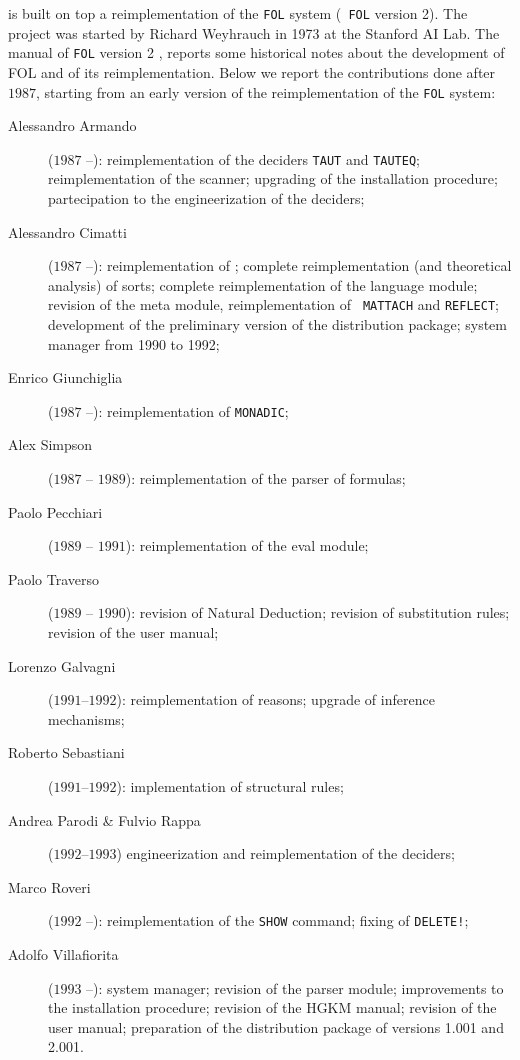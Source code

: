 {\GF} is built on top a reimplementation of the {\tt FOL} system ({\tt
FOL} version 2).
The project was started by Richard Weyhrauch in 1973 at the Stanford
AI Lab.
The manual of {\tt FOL} version 2 \cite{giunchiglia34}, reports some  historical
notes about the development of FOL and of its reimplementation.
Below we report the contributions done after $1987$, starting from an
early version of the reimplementation of the {\tt FOL} system:
%
\begin{description}
	\item[Alessandro Armando] ($1987$ --):
		reimplementation of the deciders {\tt TAUT} and {\tt TAUTEQ};
		reimplementation of the scanner; upgrading of the installation
		procedure; partecipation to the engineerization of the deciders;
	\item[Alessandro Cimatti] ($1987$ --):
		reimplementation of {\HG}; complete reimplementation (and
		theoretical analysis) of sorts; complete reimplementation of the
		language module; revision of the meta module, reimplementation of {\tt
		MATTACH} and {\tt REFLECT}; development of the preliminary version of
		the	distribution package;  system manager from 1990 to 1992;
	\item[Enrico Giunchiglia] ($1987$ --):
		reimplementation of {\tt MONADIC};
	\item[Alex Simpson] ($1987$ -- $1989$):
		reimplementation of the parser of formulas;
	\item[Paolo Pecchiari] ($1989$ -- $1991$):
		reimplementation of the eval module;
	\item[Paolo Traverso] ($1989$ -- $1990$):
		revision of Natural Deduction; revision of substitution rules;
		revision of the user manual;
	\item[Lorenzo Galvagni] ($1991$--$1992$):
		reimplementation of reasons; upgrade of inference mechanisms;
	\item[Roberto Sebastiani] ($1991$--$1992$):
		implementation of structural rules;
	\item[Andrea Parodi \& Fulvio Rappa] ($1992$--$1993$)
		engineerization and reimplementation of the deciders;
	\item[Marco Roveri] ($1992$ --):
		reimplementation of the {\tt SHOW} command; fixing of {\tt DELETE!};
	\item[Adolfo Villafiorita] ($1993$ --):
		system manager; revision of the parser module; improvements to the
		installation procedure; revision of the HGKM manual; revision of the
		user manual; preparation of the distribution package
		of versions 1.001 and 2.001.
\end{description}


